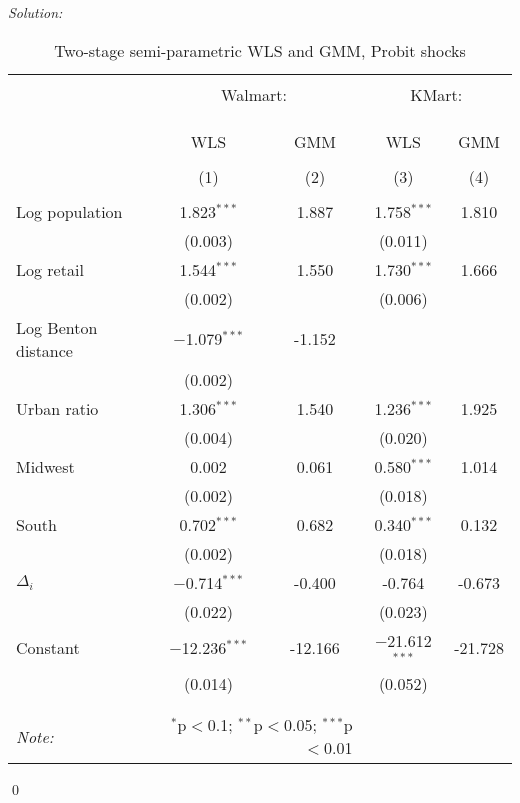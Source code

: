 \documentclass[12pt]{article}
\newenvironment{sol}
    {\emph{Solution:}
    }
    {
    \qed
    }
\begin{document}
\begin{sol}
  \begin{table}[!htbp] \centering 
    \caption{Two-stage semi-parametric WLS and GMM, Probit shocks} 
    \label{} 
  \begin{tabular}{@{\extracolsep{5pt}}lcccc} 
  \\[-1.8ex]\hline 
  \hline \\[-1.8ex] 
   & \multicolumn{2}{c}{Walmart:}& 
    \multicolumn{2}{c}{KMart:} \\
   \\\cline{2-3}  \cline{4-5} \\
  \\[-1.8ex] & WLS & GMM & WLS & GMM \\ 
  \\[-1.8ex] & (1) & (2) & (3) & (4)\\ 
  \hline \\[-1.8ex] 
   Log population & 1.823$^{***}$& 1.887 & 1.758$^{***}$ & 1.810 \\ 
    & (0.003)& & (0.011)& \\ 
   Log retail & 1.544$^{***}$ & 1.550& 1.730$^{***}$ & 1.666\\ 
    & (0.002)& & (0.006)& \\ 
   Log Benton distance & $-$1.079$^{***}$ &-1.152   \\ 
    & (0.002)& &  \\ 
   Urban ratio & 1.306$^{***}$ &1.540& 1.236$^{***}$& 1.925 \\ 
    & (0.004)& & (0.020)& \\ 
   Midwest & 0.002 & 0.061& 0.580$^{***}$ & 1.014 \\ 
    & (0.002)& & (0.018)& \\ 
   South& 0.702$^{***}$ & 0.682& 0.340$^{***}$ & 0.132 \\ 
    & (0.002)& & (0.018)& \\ 
   $\Delta_{i}$ & $-$0.714$^{***}$ & -0.400& -0.764 & -0.673 \\ 
    & (0.022)& & (0.023)&  \\ 
   Constant & $-$12.236$^{***}$ &-12.166& $-$21.612$^{***}$ & -21.728\\ 
    & (0.014) &  & (0.052)&  \\ 
  \hline \\[-1.8ex] 
 \hline 
  \hline \\[-1.8ex] 
  \textit{Note:}  & \multicolumn{2}{r}{$^{*}$p$<$0.1; $^{**}$p$<$0.05; $^{***}$p$<$0.01} \\ 
  \end{tabular} 
  \end{table} 



\end{sol}
\end{document}
